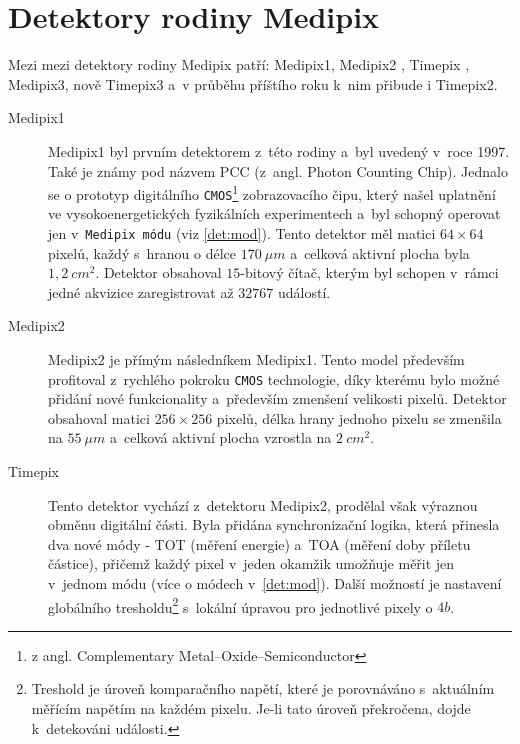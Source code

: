 \section{Detektory rodiny Medipix}\label{det:med}
Mezi mezi detektory rodiny Medipix patří: Medipix1, Medipix2 \cite{Llopart-medipix2}, Timepix \cite{Llopart2008106}, Medipix3, nově Timepix3 \cite{timepix3} a~v průběhu příštího roku k~nim přibude i Timepix2. 

\begin{description}
	\item[Medipix1] Medipix1 byl prvním detektorem z~této rodiny a~byl uvedený v~roce 1997. Také je známy pod názvem PCC (z~angl. Photon Counting Chip). Jednalo se o prototyp digitálního \texttt{CMOS}\footnote{z angl. Complementary Metal–Oxide–Semiconductor} zobrazovacího čipu, který našel uplatnění ve vysokoenergetických fyzikálních experimentech \cite{medipix-www} a~byl schopný operovat jen v~\texttt{Medipix módu} (viz \ref{det:mod}). Tento detektor měl matici $64\times64$ pixelů, každý s~hranou o délce $170~\mu m$ a~celková aktivní plocha byla $1,2~cm^2$. Detektor obsahoval $15$-bitový čítač, kterým byl schopen v~rámci jedné akvizice zaregistrovat až $32767$ událostí.

	\item[Medipix2] Medipix2 je přímým následníkem Medipix1. Tento model především profitoval z~rychlého pokroku \texttt{CMOS} technologie, díky kterému bylo možné přidání nové funkcionality a~především zmenšení velikosti pixelů. Detektor obsahoval matici $256\times256$ pixelů, délka hrany jednoho pixelu se zmenšila na $55~\mu m$ a~celková aktivní plocha vzrostla na $2~cm^2$.

	\item[Timepix]\label{det:tim} Tento detektor vychází z~detektoru Medipix2, prodělal však výraznou obměnu digitální části. Byla přidána synchronizační logika, která přinesla dva nové módy - TOT (měření energie) a~TOA (měření doby příletu částice), přičemž každý pixel v~jeden okamžik umožňuje měřit jen v~jednom módu
	(více o módech v~\ref{det:mod}). Další možností je nastavení globálního tresholdu\footnote{Treshold je úroveň komparačního napětí, které je porovnáváno s~aktuálním měřícím napětím na každém pixelu. Je-li tato úroveň překročena, dojde k~detekováni události.} s~lokální úpravou pro jednotlivé pixely o $4 b$. 


\end{description}
